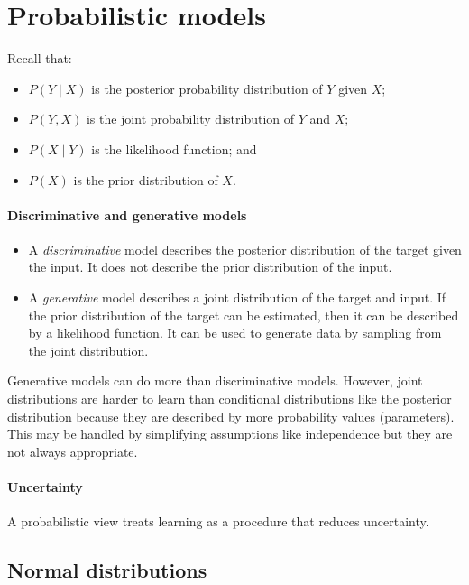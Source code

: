 \section{Probabilistic models}
\label{sec:9:probabilistic-models}

Recall that:
\begin{itemize}
  \item $P(Y \mid X)$ is the posterior probability distribution of $Y$ given $X$;
  \item $P(Y, X)$ is the joint probability distribution of $Y$ and $X$;
  \item $P(X \mid Y)$ is the likelihood function; and
  \item $P(X)$ is the prior distribution of $X$.
\end{itemize}

\paragraph{Discriminative and generative models}

\begin{itemize}
  \item A \textit{discriminative} model describes the posterior distribution of
        the target given the input.
        It does not describe the prior distribution of the input.
  \item A \textit{generative} model describes a joint distribution of the target
        and input.
        If the prior distribution of the target can be estimated, then it can be
        described by a likelihood function.
        It can be used to generate data by sampling from the joint distribution.
\end{itemize}

Generative models can do more than discriminative models.
However, joint distributions are harder to learn than conditional distributions
like the posterior distribution because they are described by more probability
values (parameters).
This may be handled by simplifying assumptions like independence but they are
not always appropriate.

\paragraph{Uncertainty}

A probabilistic view treats learning as a procedure that reduces uncertainty.

\subsection{Normal distributions}

